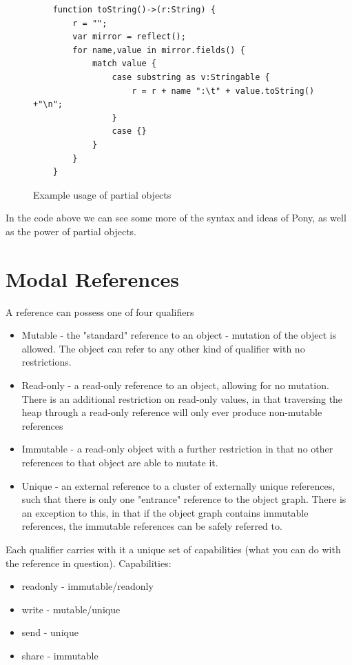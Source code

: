 \documentclass[pdftex,11pt,a4paper]{report}
\begin{document}
\begin{figure}[H]
\begin{verbatim}
    function toString()->(r:String) {
        r = "";
        var mirror = reflect();
        for name,value in mirror.fields() {
            match value {
                case substring as v:Stringable {
                    r = r + name ":\t" + value.toString() +"\n";
                }
                case {}
            }
        }
    }
\end{verbatim}
\caption{Example usage of partial objects}
\label{fig:partialobj}
\end{figure}

In the code above we can see some more of the syntax and ideas of Pony, as well as the power of partial objects.

\section{Modal References}
\label{sec:immutability}

A reference can possess one of four qualifiers\cite{microsoft2012}

\begin{itemize}
	\item Mutable - the "standard" reference to an object - mutation of the object is allowed.
		The object can refer to any other kind of qualifier with no restrictions.
	\item Read-only - a read-only reference to an object, allowing for no mutation.
		There is an additional restriction on read-only values, in that traversing the heap through a read-only reference will only ever produce non-mutable references
	\item Immutable - a read-only object with a further restriction in that no other references to that object are able to mutate it.
	\item Unique - an external reference to a cluster of externally unique references, such that there is only one "entrance" reference to the object graph.
		There is an exception to this, in that if the object graph contains immutable references, the immutable references can be safely referred to.
\end{itemize}

Each qualifier carries with it a unique set of capabilities (what you can do with the reference in question).
Capabilities:
\begin{itemize}[noitemsep]
	\item readonly - immutable/readonly
	\item write - mutable/unique
	\item send - unique
	\item share - immutable
\end{itemize}
\end{document}
